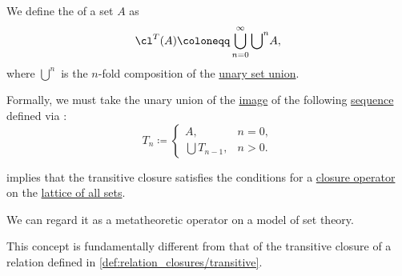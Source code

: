 \begin{definition}\label{def:set_transitive_closure}
  We define the  of a set \( A \) as
  \begin{equation*}
    \cl^T(A) \coloneqq \bigcup_{n=0}^\infty {\bigcup}^n A,
  \end{equation*}
  where \( {\bigcup}^n \) is the \( n \)-fold composition of the \hyperref[def:set_union/unary]{unary set union}.
\end{definition}
\begin{comments}
  \item Formally, we must take the unary union of the \hyperref[def:set_valued_function/image]{image} of the following \hyperref[def:sequence]{sequence} defined via :
  \begin{equation*}
    T_n \coloneqq \begin{cases}
      A,               &n = 0, \\
      \bigcup T_{n-1}, &n > 0.
    \end{cases}
  \end{equation*}

  \item {} implies that the transitive closure satisfies the conditions for a \hyperref[def:abstract_closure_operator]{closure operator} on the \hyperref[def:lattice_of_sets]{lattice of all sets}.

  We can regard it as a metatheoretic operator on a model of set theory.

  \item This concept is fundamentally different from that of the transitive closure of a relation defined in \cref{def:relation_closures/transitive}.
\end{comments}

